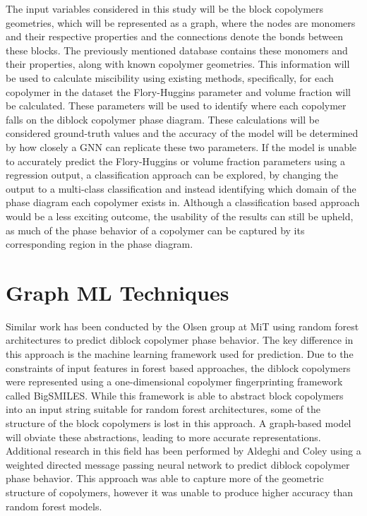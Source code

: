 \documentclass{article}
\begin{document}
The input variables considered in this study will be the block copolymers geometries, which will be represented as a graph, where the nodes are monomers and their respective properties and the connections denote the bonds between these blocks. The previously mentioned database contains these monomers and their properties, along with known copolymer geometries. This information will be used to calculate miscibility using existing methods, specifically, for each copolymer in the dataset the Flory-Huggins parameter and volume fraction will be calculated. These parameters will be used to identify where each copolymer falls on the diblock copolymer phase diagram. These calculations will be considered ground-truth values and the accuracy of the model will be determined by how closely a GNN can replicate these two parameters. If the model is unable to accurately predict the Flory-Huggins or volume fraction parameters using a regression output, a classification approach can be explored, by changing the output to a multi-class classification and instead identifying which domain of the phase diagram each copolymer exists in. Although a classification based approach would be a less exciting outcome, the usability of the results can still be upheld, as much of the phase behavior of a copolymer can be captured by its corresponding region in the phase diagram.

\section{Graph ML Techniques}

Similar work has been conducted by the Olsen group at MiT\cite{RandForest} using random forest architectures to predict diblock copolymer phase behavior. The key difference in this approach is the machine learning framework used for prediction. Due to the constraints of input features in forest based approaches, the diblock copolymers were represented using a one-dimensional copolymer fingerprinting framework called BigSMILES\cite{BigSMILES}. While this framework is able to abstract block copolymers into an input string suitable for random forest architectures, some of the structure of the block copolymers is lost in this approach. A graph-based model will obviate these abstractions, leading to more accurate representations. Additional research in this field has been performed by Aldeghi and Coley\cite{Coley} using a weighted directed message passing neural network to predict diblock copolymer phase behavior. This approach was able to capture more of the geometric structure of copolymers, however it was unable to produce higher accuracy than random forest models. 
\end{document}
